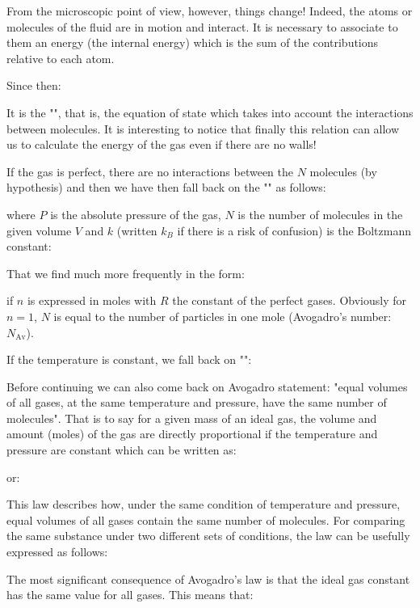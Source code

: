 	From the microscopic point of view, however, things change! Indeed, the atoms or molecules of the fluid are in motion and interact. It is necessary to associate to them an energy (the internal energy) which is the sum of the contributions relative to each atom.

	Since then:
	
	It is the "", that is, the equation of state which takes into account the interactions between molecules. It is interesting to notice that finally this relation can allow us to calculate the energy of the gas even if there are no walls!

	If the gas is perfect, there are no interactions between the $N$ molecules (by hypothesis) and then we have then fall back on the "" as follows:
	
	where $P$ is the absolute pressure of the gas, $N$ is the number of molecules in the given volume $V$ and $k$ (written $k_B$ if there is a risk of confusion) is the Boltzmann constant:
	
	That we find much more frequently in the form:
	
	if $n$ is expressed in moles with $R$ the constant of the perfect gases. Obviously for $n=1$,  $N$ is equal to the number of particles in one mole (Avogadro's number: $N_\text{Av}$).

	If the temperature is constant, we fall back on "":
	
	Before continuing we can also come back on Avogadro statement: "equal volumes of all gases, at the same temperature and pressure, have the same number of molecules". That is to say for a given mass of an ideal gas, the volume and amount (moles) of the gas are directly proportional if the temperature and pressure are constant which can be written as:
	
	or:
	
	This law describes how, under the same condition of temperature and pressure, equal volumes of all gases contain the same number of molecules. For comparing the same substance under two different sets of conditions, the law can be usefully expressed as follows:
	
	The most significant consequence of Avogadro's law is that the ideal gas constant has the same value for all gases. This means that:
	
